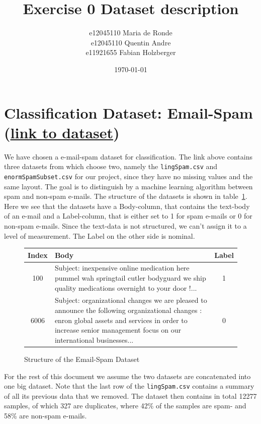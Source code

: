 \documentclass[11pt]{article}
\title{Exercise 0 Dataset description}
\author{e12045110 Maria de Ronde \\ e12045110  Quentin Andre  \\ e11921655 Fabian Holzberger}
\date{\today}
\begin{document}
\graphicspath{{./figures/}}
\maketitle

\newpage
%
\section{Classification Dataset: Email-Spam (\href{https://www.kaggle.com/nitishabharathi/email-spam-dataset?select=enronSpamSubset.csv}{link to dataset})}
We have chosen a e-mail-spam dataset for classification. The link above contains three datasets from which choose two, namely the \texttt{lingSpam.csv} and \texttt{enormSpamSubset.csv} for our project, since they have no missing values and the same layout. The goal is to distinguish by a machine learning algorithm between spam and non-spam e-mails. The structure of the datasets is shown in table~\ref{tab::0}. Here we see that the datasets have a Body-column, that contains the text-body of an e-mail and a Label-column, that is either set to 1 for spam e-mails or 0 for non-spam e-mails. Since the text-data is not structured, we can't assign it to a level of measurement. The Label on the other side is nominal.   
%
\begin{figure}[h]
  \begin{tabular}{ | c | p{15cm} | c |}
    \hline
    Index & Body & Label \\
    \hline
    100 & 
    Subject: inexpensive online medication here
 pummel wah springtail cutler bodyguard
 we ship quality medications overnight to your door !...
    & 1 \\ \hline
    6006
    &
    Subject: organizational changes
 we are pleased to announce the following organizational changes :
 enron global assets and services
 in order to increase senior management focus on our international businesses... 
    & 0 \\
    \hline
    \end{tabular}
    \caption{Structure of the Email-Spam Dataset}
    \label{tab::0}
  \end{figure}
%
For the rest of this document we assume the two datasets are concatenated into one big dataset. Note that the last row of the \texttt{lingSpam.csv} contains a summary of all its previous data that we removed. The dataset then contains in total 12277 samples, of which 327 are duplicates, where 42\% of the samples are spam- and 58\% are non-spam e-mails. %
\end{document}
